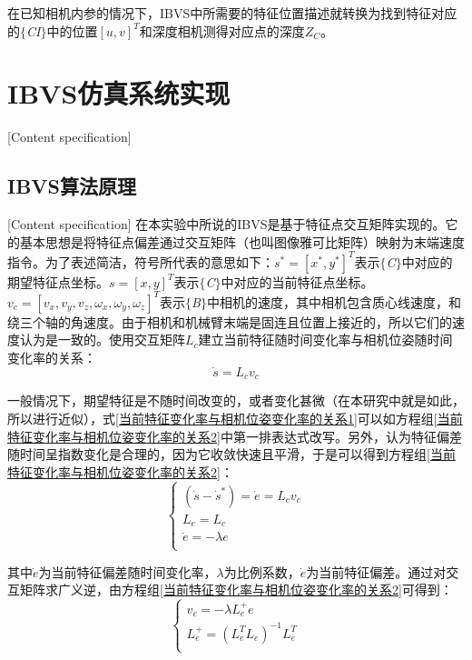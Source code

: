 \documentclass[fontset=fandol,type=bachelor,campus=harbin,bsmainpagenumberline=true]{hithesisbook}
\begin{document}
在已知相机内参的情况下，IBVS中所需要的特征位置描述就转换为找到特征对应的$\lbrace$\textit{CI}$\rbrace$中的位置$\left[ u,v \right] ^T$和深度相机测得对应点的深度$Z_C$。

\section{IBVS仿真系统实现}[Content specification]
\subsection{IBVS算法原理}[Content specification]
在本实验中所说的IBVS是基于特征点交互矩阵实现的\cite{chaumette2006visual}。它的基本思想是将特征点偏差通过交互矩阵（也叫图像雅可比矩阵）映射为末端速度指令。为了表述简洁，符号所代表的意思如下：$s^*=\left[ x^*,y^* \right] ^T$表示$\lbrace$\textit{C}$\rbrace$中对应的期望特征点坐标。$s=\left[ x,y \right] ^T$表示$\lbrace$\textit{C}$\rbrace$中对应的当前特征点坐标。$v_c=\left[ v_x,v_y,v_z,\omega _x,\omega _y,\omega _z \right] ^T$表示$\lbrace$\textit{B}$\rbrace$中相机的速度，其中相机包含质心线速度，和绕三个轴的角速度。由于相机和机械臂末端是固连且位置上接近的，所以它们的速度认为是一致的。使用交互矩阵$L_c$建立当前特征随时间变化率与相机位姿随时间变化率的关系：
\begin{equation}
\dot{s}=L_cv_c 
\label{当前特征变化率与相机位姿变化率的关系1} 
\end{equation} 


一般情况下，期望特征是不随时间改变的，或者变化甚微（在本研究中就是如此，所以进行近似），式\ref{当前特征变化率与相机位姿变化率的关系1}可以如方程组\ref{当前特征变化率与相机位姿变化率的关系2}中第一排表达式改写。另外，认为特征偏差随时间呈指数变化是合理的，因为它收敛快速且平滑\cite{chaumette2006visual}，于是可以得到方程组\ref{当前特征变化率与相机位姿变化率的关系2}：
\begin{equation}
\left\{ \begin{array}{c}
	\left( \dot{s}-\dot{s}^* \right) =\dot{e}=L_cv_c\\
	L_e=L_c\\
	\dot{e}=-\lambda e\\
\end{array} \right.  
\label{当前特征变化率与相机位姿变化率的关系2} 
\end{equation} 


其中$\dot{e}$为当前特征偏差随时间变化率，$\lambda$为比例系数，$\dot{e}$为当前特征偏差。通过对交互矩阵求广义逆，由方程组\ref{当前特征变化率与相机位姿变化率的关系2}可得到：
\begin{equation}
\left\{ \begin{array}{c}
	v_c=-\lambda L_{e}^{+}e\\
	L_{e}^{+}=\left( L_{e}^{T}L_e \right) ^{-1}L_{e}^{T}\\
\end{array} \right. 
\label{当前特征变化率与相机位姿变化率的关系3} 
\end{equation} 
\end{document}
